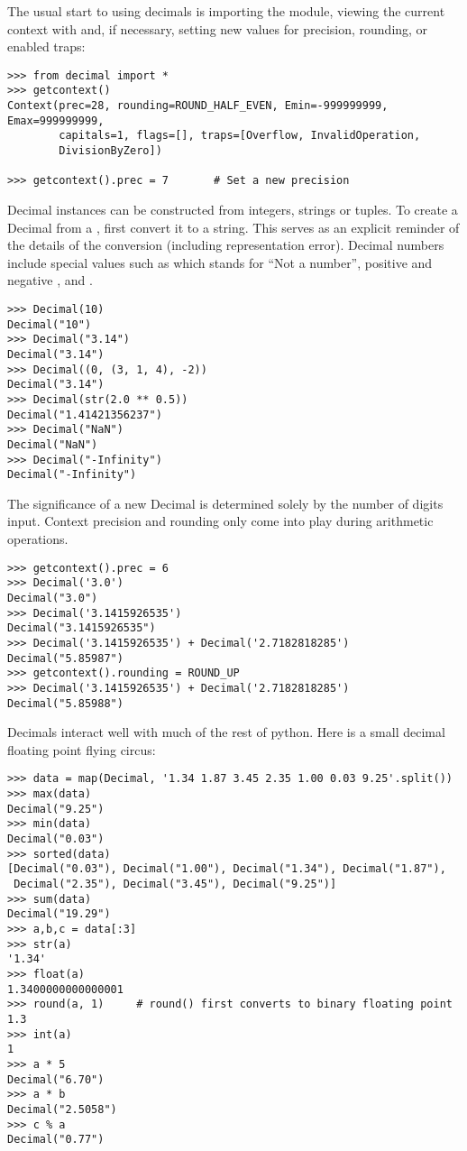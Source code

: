 The usual start to using decimals is importing the module, viewing the current
context with  and, if necessary, setting new values
for precision, rounding, or enabled traps:

\begin{verbatim}
>>> from decimal import *
>>> getcontext()
Context(prec=28, rounding=ROUND_HALF_EVEN, Emin=-999999999, Emax=999999999,
        capitals=1, flags=[], traps=[Overflow, InvalidOperation,
        DivisionByZero])

>>> getcontext().prec = 7       # Set a new precision
\end{verbatim}


Decimal instances can be constructed from integers, strings or tuples.  To
create a Decimal from a , first convert it to a string.  This
serves as an explicit reminder of the details of the conversion (including
representation error).  Decimal numbers include special values such as
 which stands for ``Not a number'', positive and negative
, and .        

\begin{verbatim}
>>> Decimal(10)
Decimal("10")
>>> Decimal("3.14")
Decimal("3.14")
>>> Decimal((0, (3, 1, 4), -2))
Decimal("3.14")
>>> Decimal(str(2.0 ** 0.5))
Decimal("1.41421356237")
>>> Decimal("NaN")
Decimal("NaN")
>>> Decimal("-Infinity")
Decimal("-Infinity")
\end{verbatim}


The significance of a new Decimal is determined solely by the number
of digits input.  Context precision and rounding only come into play during
arithmetic operations.

\begin{verbatim}
>>> getcontext().prec = 6
>>> Decimal('3.0')
Decimal("3.0")
>>> Decimal('3.1415926535')
Decimal("3.1415926535")
>>> Decimal('3.1415926535') + Decimal('2.7182818285')
Decimal("5.85987")
>>> getcontext().rounding = ROUND_UP
>>> Decimal('3.1415926535') + Decimal('2.7182818285')
Decimal("5.85988")
\end{verbatim}


Decimals interact well with much of the rest of python.  Here is a small
decimal floating point flying circus:
    
\begin{verbatim}    
>>> data = map(Decimal, '1.34 1.87 3.45 2.35 1.00 0.03 9.25'.split())
>>> max(data)
Decimal("9.25")
>>> min(data)
Decimal("0.03")
>>> sorted(data)
[Decimal("0.03"), Decimal("1.00"), Decimal("1.34"), Decimal("1.87"),
 Decimal("2.35"), Decimal("3.45"), Decimal("9.25")]
>>> sum(data)
Decimal("19.29")
>>> a,b,c = data[:3]
>>> str(a)
'1.34'
>>> float(a)
1.3400000000000001
>>> round(a, 1)     # round() first converts to binary floating point
1.3
>>> int(a)
1
>>> a * 5
Decimal("6.70")
>>> a * b
Decimal("2.5058")
>>> c % a
Decimal("0.77")
\end{verbatim}

